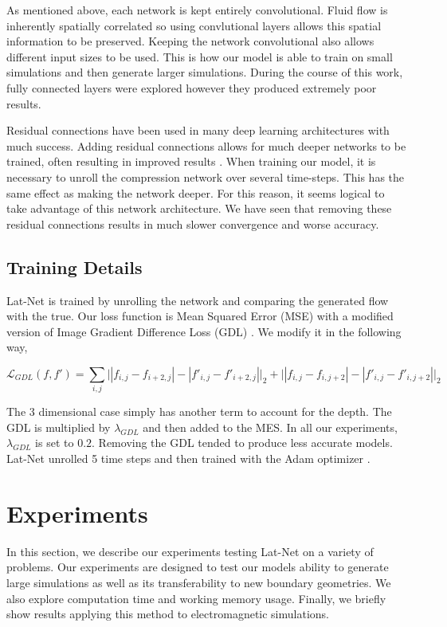 \documentclass{article}
\begin{document}
As mentioned above, each network is kept entirely convolutional. Fluid flow is inherently spatially correlated so using convlutional layers allows this spatial information to be preserved. Keeping the network convolutional also allows different input sizes to be used. This is how our model is able to train on small simulations and then generate larger simulations. During the course of this work, fully connected layers were explored however they produced extremely poor results.

Residual connections have been used in many deep learning architectures with much success. Adding residual connections allows for much deeper networks to be trained, often resulting in improved results \cite{he2016deep}. When training our model, it is necessary to unroll the compression network over several time-steps. This has the same effect as making the network deeper. For this reason, it seems logical to take advantage of this network architecture. We have seen that removing these residual connections results in much slower convergence and worse accuracy.

\subsection{Training Details}

Lat-Net is trained by unrolling the network and comparing the generated flow with the true. Our loss function is Mean Squared Error (MSE) with a modified version of Image Gradient Difference Loss (GDL) \cite{mathieu2015deep}. We modify it in the following way,

\begin{equation}
  \mathcal{L}_{GDL}(f,f') = \sum_{i,j} \big||f_{i,j} - f_{i+2,j}| - |f'_{i,j} - f'_{i+2,j}| \big|_{2} + \big||f_{i,j} - f_{i,j+2}| - |f'_{i,j} - f'_{i,j+2}| \big|_{2}
\end{equation}

The 3 dimensional case simply has another term to account for the depth. The GDL is multiplied by $\lambda_{GDL}$ and then added to the MES. In all our experiments, $\lambda_{GDL}$ is set to $0.2$. Removing the GDL tended to produce less accurate models. Lat-Net unrolled 5 time steps and then trained with the Adam optimizer \cite{kingma2014adam}.

\section{Experiments}

In this section, we describe our experiments testing Lat-Net on a variety of problems. Our experiments are designed to test our models ability to generate large simulations as well as its transferability to new boundary geometries. We also explore computation time and working memory usage. Finally, we briefly show results applying this method to electromagnetic simulations.
\end{document}
